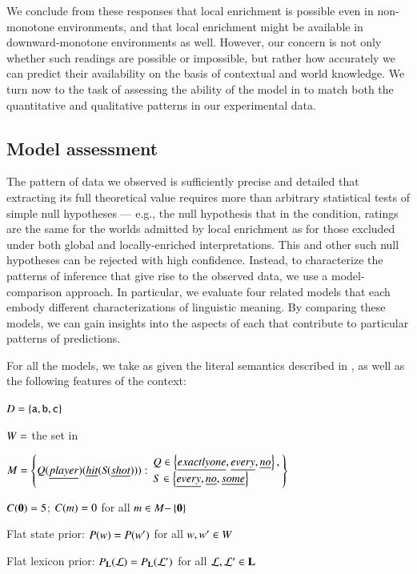 \documentclass[leqno,12pt]{article}
\begin{document}
We conclude from these responses that local enrichment is possible
even in non-monotone environments, and that local enrichment might be
available in downward-monotone environments as well. However, our
concern is not only whether such readings are possible or impossible,
but rather how accurately we can predict their availability on the
basis of contextual and world knowledge.  We turn now to the task of
assessing the ability of the model in  to match both
the quantitative and qualitative patterns in our experimental data.


\subsection{Model assessment}

The pattern of data we observed is sufficiently precise and detailed
that extracting its full theoretical value requires more than
arbitrary statistical tests of simple null hypotheses --- e.g., the null
hypothesis that in the  condition, ratings
are the same for the worlds admitted by local enrichment as for those
excluded under both global and locally-enriched interpretations.  This
and other such null hypotheses can be rejected with high confidence.
Instead, to characterize the patterns of inference that give rise to
the observed data, we use a model-comparison approach. In particular,
we evaluate four related models that each embody different
characterizations of linguistic meaning. By comparing these models, we
can gain insights into the aspects of each that contribute to
particular patterns of predictions.

For all the models, we take as given the literal semantics described
in , as well as the following features of the
context:
%
\begin{examples}
\item\label{expmod}
  \begin{examples}
  \item $D = \left\{ \texttt{a}, \texttt{b}, \texttt{c} \right\}$
  \item $W = $ the set in 
  \item\label{expformulae} $\Messages =
    \setlength{\arraycolsep}{2pt}
    \set{
      Q(\word{player})(\word{hit}(S\negthinspace(\word{shot}))) :
      \begin{array}{l}        
        Q \in \set{\word{exactly one}, \word{every}, \word{no}}, \\
        S \in \set{\word{every}, \word{no}, \word{some}}
      \end{array}}$
  \item $C(\mathbf{0}) = 5$; $C(m) = 0$ for all $m \in M{-}\left\{ \mathbf{0} \right\}$  
  \item Flat state prior: $P(w) = P(w')$ for all $w, w' \in W$
  \item Flat lexicon prior: $P_{\mathbf{L}}(\mathcal{L}) = P_{\mathbf{L}}(\mathcal{L}')$ for all $\mathcal{L}, \mathcal{L}' \in \mathbf{L}$
  \end{examples}
\end{examples}
\end{document}
